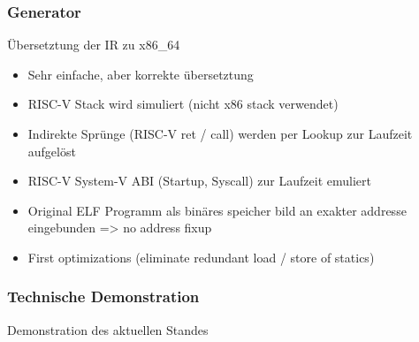 \begin{frame}
    \frametitle{Generator}{Übersetztung der IR zu x86\_64}

    \begin{itemize}
        \item Sehr einfache, aber korrekte übersetztung
        \item RISC-V Stack wird simuliert (nicht x86 stack verwendet)
        \item Indirekte Sprünge (RISC-V ret / call) werden per Lookup zur Laufzeit aufgelöst
        \item RISC-V System-V ABI (Startup, Syscall) zur Laufzeit emuliert
        \item Original ELF Programm als binäres speicher bild an exakter addresse eingebunden => no address fixup
        \item First optimizations (eliminate redundant load / store of statics)
    \end{itemize}
\end{frame}
\clearpage


\begin{frame}
    \frametitle{Technische Demonstration}{Demonstration des aktuellen Standes}

\end{frame}
\clearpage

